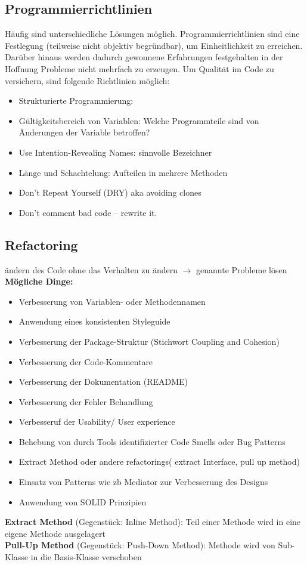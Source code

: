 \documentclass{book}
\begin{document}
    \subsection{Programmierrichtlinien}
    Häufig sind unterschiedliche Lösungen möglich.
    Programmierrichtlinien sind eine Festlegung (teilweise nicht objektiv begründbar), um Einheitlichkeit zu
    erreichen. Darüber hinaus werden dadurch gewonnene Erfahrungen festgehalten in der Hoffnung Probleme
    nicht mehrfach zu erzeugen. Um Qualität im Code zu versichern, sind folgende Richtlinien möglich:
    \begin{itemize}
        \item Strukturierte Programmierung:
        \item Gültigkeitsbereich von Variablen: Welche Programmteile sind
        von Änderungen der Variable betroffen?
        \item Use Intention-Revealing Names: sinnvolle Bezeichner
        \item Länge und Schachtelung: Aufteilen in mehrere Methoden
        \item Don’t Repeat Yourself (DRY) aka avoiding clones
        \item Don’t comment bad code – rewrite it.
    \end{itemize}
    \subsection{Refactoring}
    ändern des Code ohne das Verhalten zu ändern $\rightarrow $ genannte Probleme
    lösen\\[1em]
    \textbf{Mögliche Dinge:}
    \begin{itemize}
        \item Verbesserung von Variablen- oder Methodennamen
        \item Anwendung eines konsistenten Styleguide
        \item Verbesserung der Package-Struktur (Stichwort Coupling and Cohesion)
        \item Verbesserung der Code-Kommentare
        \item Verbesserung der Dokumentation (README)
        \item Verbesserung der Fehler Behandlung
        \item Verbesseruf der Usability/ User experience
        \item Behebung von durch Tools identifizierter Code Smells oder Bug Patterns
        \item Extract Method oder andere refactorings( extract Interface, pull up method)
        \item Einsatz von Patterns wie zb Mediator zur Verbesserung des Designs
        \item Anwendung von SOLID Prinzipien
    \end{itemize}
    \textbf{Extract Method} (Gegenstück: Inline Method): Teil einer Methode wird in eine eigene Methode ausgelagert\\[1em]
    \textbf{Pull-Up Method} (Gegenstück: Push-Down Method): Methode wird von Sub-Klasse in die Basis-Klasse verschoben
\end{document}
